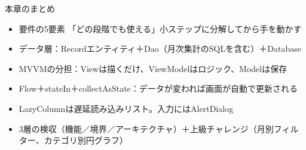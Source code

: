 \begin{tcbsummary}{本章のまとめ}
\begin{itemize}
  \item 要件の5要素 「どの段階でも使える」小ステップに分解してから手を動かす
  \item データ層：Recordエンティティ＋Dao（月次集計のSQLを含む）＋Database
  \item MVVMの分担：Viewは描くだけ、ViewModelはロジック、Modelは保存
  \item Flow＋stateIn＋collectAsState：データが変われば画面が自動で更新される
  \item LazyColumnは遅延読み込みリスト。入力にはAlertDialog
  \item 3層の検収（機能／境界／アーキテクチャ）＋上級チャレンジ（月別フィルター、カテゴリ別円グラフ）
\end{itemize}

\end{tcbsummary}
